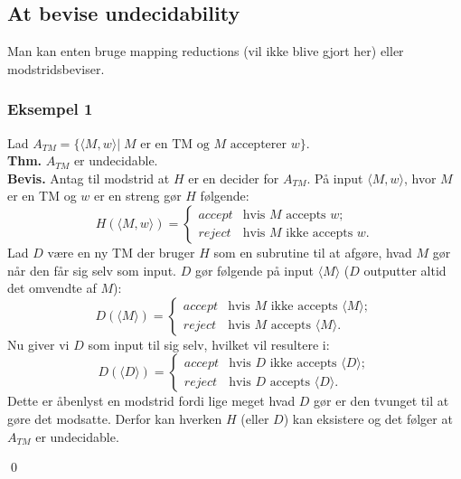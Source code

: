 \subsection*{At bevise undecidability}

Man kan enten bruge mapping reductions (vil ikke blive gjort her) eller modstridsbeviser. 

\subsubsection*{Eksempel 1}

Lad $A_{TM}=\{\langle M,w \rangle | \; M \text{ er en TM og } M \text{ accepterer } w\}$. \\

\textbf{Thm.} $A_{TM}$ er undecidable. \\

\textbf{Bevis.} Antag til modstrid at $H$ er en decider for $A_{TM}$. På input $\langle M, w \rangle$, hvor $M$ er en TM og $w$ er en streng gør $H$ følgende: 
\[H(\langle M, w\rangle)= \left\{ \begin{array}{ll} accept & \mbox{hvis $M$ accepts $w$};\\reject & \mbox{hvis $M$ ikke accepts $w$}.\end{array} \right. \] 
Lad $D$ være en ny TM der bruger $H$ som en subrutine til at afgøre, hvad $M$ gør når den får sig selv som input. $D$ gør følgende på input $\langle M \rangle$ ($D$ outputter altid det omvendte af $M$):
\[D(\langle M\rangle)= \left\{ \begin{array}{ll} accept & \mbox{hvis $M$ ikke accepts $\langle M \rangle$};\\reject & \mbox{hvis $M$ accepts $\langle M \rangle$}.\end{array} \right. \] 
Nu giver vi $D$ som input til sig selv, hvilket vil resultere i:
\[D(\langle D \rangle)= \left\{ \begin{array}{ll} accept & \mbox{hvis $D$ ikke accepts $\langle D \rangle$};\\reject & \mbox{hvis $D$ accepts $\langle D \rangle$}.\end{array} \right. \] 
Dette er åbenlyst en modstrid fordi lige meget hvad $D$ gør er den tvunget til at gøre det modsatte. Derfor kan hverken $H$ (eller $D$) kan eksistere og det følger at $A_{TM}$ er undecidable. 
\begin{flushright}
	\qed
\end{flushright}
